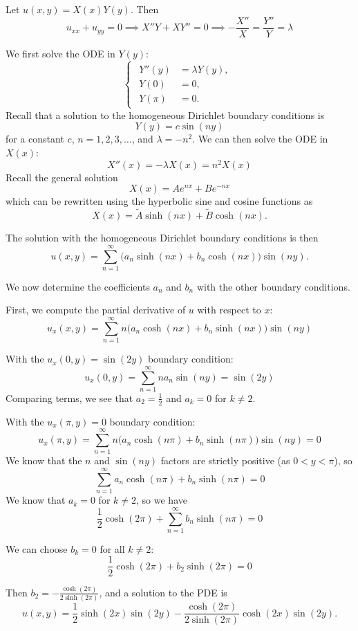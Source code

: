 \documentclass[plain]{pset}
\begin{document}
\begin{solution}
    Let \(u(x, y) = X(x)Y(y)\). Then
    \[u_{xx} + u_{yy} = 0 \implies X''Y + XY'' = 0 \implies -\frac{X''}{X} = \frac{Y''}{Y} = \lambda\]

    We first solve the ODE in \(Y(y)\):
    \[
        \begin{cases}
            \begin{aligned}
                Y''(y) &= \lambda Y(y), \\
                Y(0)                 & = 0, \\
                Y(\pi)               & = 0.
            \end{aligned}
        \end{cases}
    \]
    Recall that a solution to the homogeneous Dirichlet boundary conditions is
    \[Y(y) = c \sin(ny)\]
    for a constant \(c\), \(n = 1, 2, 3, \ldots\), and \(\lambda = -n^2\). We can then solve the ODE in \(X(x)\):
    \[X''(x) = -\lambda X(x) = n^2 X(x)\]
    Recall the general solution
    \[X(x) = Ae^{nx} + Be^{-nx}\]
    which can be rewritten using the hyperbolic sine and cosine functions as
    \[X(x) = \tilde{A}\sinh(nx) + \tilde{B}\cosh(nx).\]

    The solution with the homogeneous Dirichlet boundary conditions is then
    \[u(x, y) = \sum_{n=1}^\infty \bigl(a_n\sinh(nx) + b_n\cosh(nx)\bigr)\sin(ny).\]

    We now determine the coefficients \(a_n\) and \(b_n\) with the other boundary conditions.

    First, we compute the partial derivative of \(u\) with respect to \(x\):
    \[u_x(x, y) = \sum_{n=1}^\infty n\bigl(a_n\cosh(nx) + b_n\sinh(nx)\bigr)\sin(ny)\]

    With the \(u_x(0, y) = \sin(2y)\) boundary condition:
    \[u_x(0, y) = \sum_{n=1}^\infty n a_n \sin(ny) = \sin(2y)\]
    Comparing terms, we see that \(a_2 = \frac{1}{2}\) and \(a_k = 0\) for \(k \neq 2\).

    With the \(u_x(\pi, y) = 0\) boundary condition:
    \[u_x(\pi, y) = \sum_{n=1}^\infty n\bigl(a_n\cosh(n\pi) + b_n\sinh(n\pi)\bigr)\sin(ny) = 0\]
    We know that the \(n\) and \(\sin(ny)\) factors are strictly positive (as \(0 < y < \pi\)), so
    \[\sum_{n=1}^\infty a_n\cosh(n\pi) + b_n\sinh(n\pi) = 0\]
    We know that \(a_k = 0\) for \(k \neq 2\), so we have
    \[\frac{1}{2}\cosh(2\pi) + \sum_{n=1}^\infty b_n\sinh(n\pi) = 0\]

    We can choose \(b_k = 0\) for all \(k \neq 2\):
    \[\frac{1}{2}\cosh(2\pi) + b_2\sinh(2\pi) = 0\]

    Then \(b_2 = -\frac{\cosh(2\pi)}{2\sinh(2\pi)}\), and a solution to the PDE is
    \[u(x, y) = \frac{1}{2}\sinh(2x)\sin(2y) - \frac{\cosh(2\pi)}{2\sinh(2\pi)}\cosh(2x)\sin(2y).\]


\end{solution}
\end{document}

